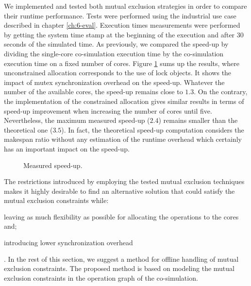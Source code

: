 We implemented and tested both mutual exclusion strategies in order to compare their runtime performance. Tests were performed using the industrial use case described in chapter \ref{ch:6-eval}. Execution times measurements were performed by getting the system time stamp at the beginning of the execution and after $30$ seconds of the simulated time. As previously, we compared the speed-up by dividing the single-core co-simulation execution time by the co-simulation execution time on a fixed number of cores. Figure \ref{fig:real-speedup} sums up the results, where unconstrained allocation corresponds to the use of lock objects. It shows the impact of mutex synchronization overhead on the speed-up. Whatever the number of the available cores, the speed-up remains close to $1.3$. On the contrary, the implementation of the constrained allocation gives similar results in terms of speed-up improvement when increasing the number of cores until five. Nevertheless, the maximum measured speed-up ($2.4$) remains smaller than the theoretical one ($3.5$). In fact, the theoretical speed-up computation considers the makespan ratio without any estimation of the runtime overhead which certainly has an important impact on the speed-up.


\begin{figure}[phbt]
\centering

\caption{Measured speed-up.}
\label{fig:real-speedup}
\end{figure}


The restrictions introduced by employing the tested mutual exclusion techniques makes it highly desirable to find an alternative solution that could satisfy the mutual exclusion constraints while: \begin{inlinelist} \item leaving as much flexibility as possible for allocating the operations to the cores and; \item introducing lower synchronization overhead \end{inlinelist}. In the rest of this section, we suggest a method for offline handling of mutual exclusion constraints. The proposed method is based on modeling the mutual exclusion constraints in the operation graph of the co-simulation.

